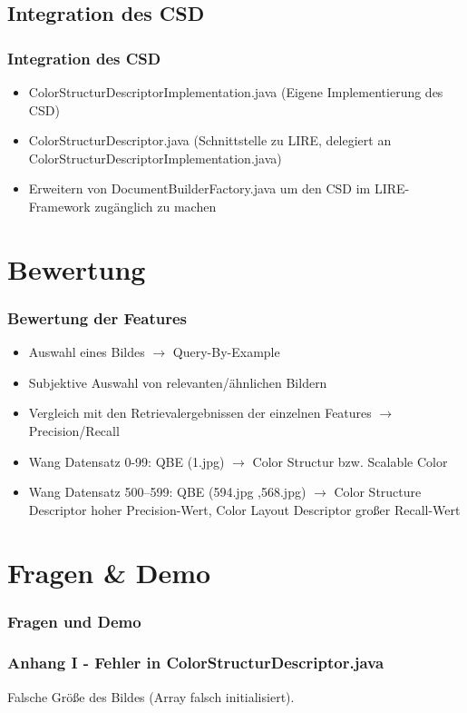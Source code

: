 \documentclass[11pt]{beamer}
\begin{document}
\subsection{Integration des CSD}
\begin{frame}
	\frametitle{Integration des CSD}
	\begin{itemize}
	  \item ColorStructurDescriptorImplementation.java (Eigene Implementierung des CSD)
	  \item ColorStructurDescriptor.java (Schnittstelle zu LIRE, delegiert an ColorStructurDescriptorImplementation.java)
	  \item Erweitern von DocumentBuilderFactory.java um den CSD im LIRE-Framework zugänglich zu machen
	\end{itemize}
\end{frame}

\section{Bewertung}
\begin{frame}
	\frametitle{Bewertung der Features}
	\begin{itemize}
	  \item Auswahl eines Bildes $\rightarrow$ Query-By-Example
	  \item Subjektive Auswahl von relevanten/ähnlichen Bildern
	  \item Vergleich mit den Retrievalergebnissen der einzelnen Features $\rightarrow$ Precision/Recall
	  \item Wang Datensatz 0-99: QBE (1.jpg) $\rightarrow$ Color Structur bzw. Scalable Color
	  \item Wang Datensatz 500–599: QBE (594.jpg ,568.jpg) $\rightarrow$ Color Structure Descriptor hoher Precision-Wert, Color Layout Descriptor großer Recall-Wert
	\end{itemize}
\end{frame}


\section{Fragen \& Demo}
\begin{frame}
	\frametitle{Fragen und Demo}
\end{frame}


\begin{frame}
	\frametitle{Anhang I - Fehler in ColorStructurDescriptor.java}
	Falsche Größe des Bildes (Array falsch initialisiert).
	
\end{frame}
\end{document}
